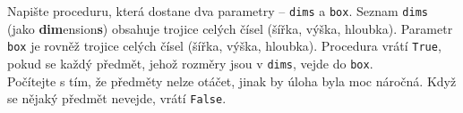 \question[50]
Napište proceduru, která dostane dva parametry -- \texttt{dims} a \texttt{box}.
Seznam \texttt{dims} (jako \textbf{dim}ension\textbf{s}) obsahuje trojice celých
čísel (šířka, výška, hloubka). Parametr \texttt{box} je rovněž trojice celých
čísel (šířka, výška, hloubka). Procedura vrátí \texttt{True}, pokud se každý
předmět, jehož rozměry jsou v \texttt{dims}, vejde do \texttt{box}.\\
Počítejte s tím, že předměty nelze otáčet, jinak by úloha byla moc náročná.
Když se nějaký předmět nevejde, vrátí \texttt{False}.